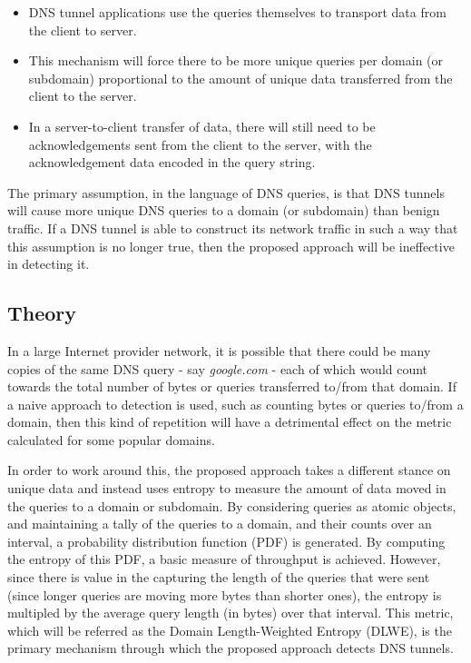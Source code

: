 \documentclass[12pt]{report}
\theoremstyle{remark}
\theoremstyle{definition}
\theoremstyle{definition}
\theoremstyle{definition}
\begin{document}
\begin{itemize}
\item DNS tunnel applications use the queries themselves to transport data from
the client to server.
\item This mechanism will force there to be more unique
queries per domain (or subdomain) proportional to the amount of unique data transferred
from the client to the server.
\item In a server-to-client transfer of data, there will still need to be
acknowledgements sent from the client to the server, with the acknowledgement
data encoded in the query string.
\end{itemize}

The primary assumption, in the language of DNS queries, is that DNS tunnels will
cause more unique DNS queries to a domain (or subdomain) than benign traffic. If
a DNS tunnel is able to construct its network traffic in such a way that this
assumption is no longer true, then the proposed approach will be ineffective in
detecting it.

\subsection{Theory}
In a large Internet provider network, it is possible that there could be many
copies of the same DNS query - say \emph{google.com} - each of which would count
towards the total number of bytes or queries transferred to/from that domain. If a naive
approach to detection is used, such as counting bytes or queries to/from a
domain, then this kind of repetition will have a detrimental effect on the
metric calculated for some popular domains.

In order to work around this, the proposed approach takes a different stance on
unique data and instead uses entropy to measure the amount of data moved in the
queries to a domain or subdomain. By considering queries as atomic objects, and
maintaining a tally of the queries to a domain, and their counts over an
interval, a probability distribution function (PDF) is generated. By computing
the entropy of this PDF, a basic measure of throughput is achieved. However,
since there is value in the capturing the length of the queries that were sent
(since longer queries are moving more bytes than shorter ones), the entropy is
multipled by the average query length (in bytes) over that interval. This
metric, which will be referred as the Domain Length-Weighted Entropy (DLWE), is
the primary mechanism through which the proposed approach detects DNS tunnels.
\end{document}
